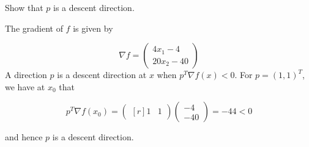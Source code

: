 Show that $p$ is a descent direction.

\begin{solution}
    The gradient of $f$ is given by

    $$
    \nabla f = \begin{pmatrix*}
        4 x_1 - 4 \\
        20 x_2 - 40
    \end{pmatrix*}
    $$
    A direction $p$ is a descent direction at $x$ when $p^T \nabla f(x) < 0$. For $p = (1, 1)^T$, we have at $x_0$ that

    $$
    p^T \nabla f(x_0) = \begin{pmatrix*}[r]
        1 & 1
    \end{pmatrix*} \begin{pmatrix*}
        -4 \\
        -40
    \end{pmatrix*} = -44 < 0
    $$

    and hence $p$ is a descent direction.
    \ \\
\end{solution}